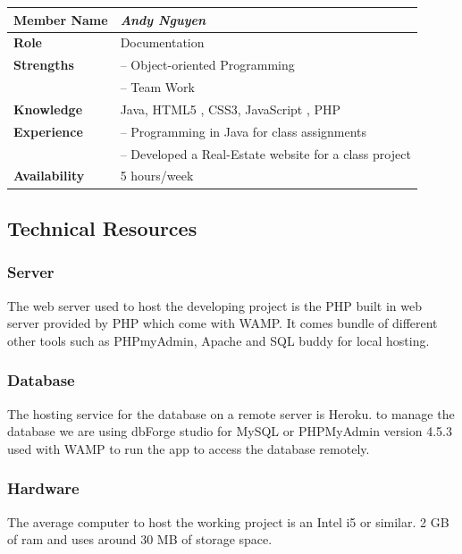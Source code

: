 \documentclass[12pt]{article}
\begin{document}
%
\vspace{3mm}
%
\begin{center}
\begin{tabular}{ p{2.7cm} | p{9cm} }
\hline
\textbf{Member Name}	&	\textit{\textbf{Andy Nguyen}}	\\ \hline \hline
\textbf{Role}		&	Documentation	\\ \hline
\textbf{Strengths}	&	-- Object-oriented Programming	\\
					&	-- Team Work	\\ \hline
\textbf{Knowledge}	&	Java, HTML5 , CSS3, JavaScript , PHP	\\ \hline
\textbf{Experience}	&	-- Programming in Java for class assignments	\\
					&	-- Developed a Real-Estate website for a class project	\\ \hline
\textbf{Availability}	&	5 hours/week	\\ \hline
\end{tabular}
\end{center}
%
\vspace{3mm}
%
\subsection{Technical Resources}

\subsubsection{Server}

The web server used to host the developing project is the PHP built in web server provided by PHP which come with WAMP. It comes bundle of different other tools such as PHPmyAdmin, Apache and SQL buddy for local hosting.
\subsubsection{Database}

 The hosting service for the database on a remote server is Heroku. to manage the database we are using dbForge studio for MySQL or PHPMyAdmin version 4.5.3 used with WAMP to run the app to access the database remotely.

\subsubsection{Hardware}

 The average computer to host the working project is an Intel i5 or similar. 2 GB of ram and uses around 30 MB of storage space. 
\end{document}
